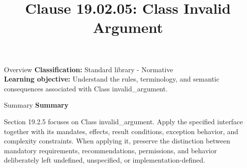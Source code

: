 \documentclass[10pt,letterpaper]{article}
\title{Clause 19.02.05: Class Invalid Argument}
\author{}
\date{}
\begin{document}
\maketitle
\begin{CornellOverviewBox}{Overview}
\textbf{Classification:} Standard library - Normative\\[2pt]
\textbf{Learning objective:} Understand the rules, terminology, and semantic consequences associated with Class invalid\_argument.
\end{CornellOverviewBox}\begin{CornellSummaryBox}{Summary}
{\sffamily\bfseries\color{Accent} Summary}\par\vspace{3pt}Section 19.2.5 focuses on Class invalid\_argument. Apply the specified interface together with its mandates, effects, result conditions, exception behavior, and complexity constraints. When applying it, preserve the distinction between mandatory requirements, recommendations, permissions, and behavior deliberately left undefined, unspecified, or implementation-defined.
\end{CornellSummaryBox}
\end{document}
